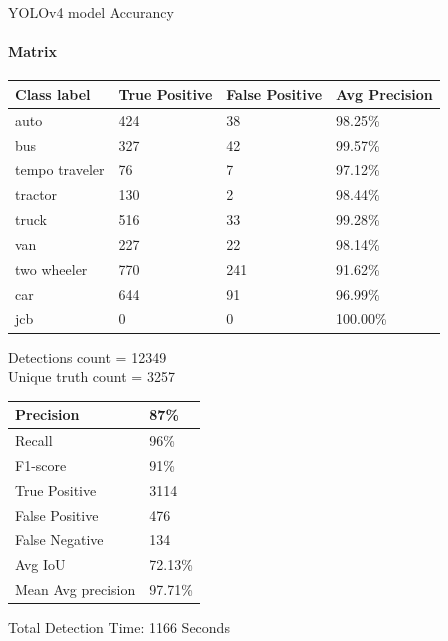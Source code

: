 \documentclass{beamer}
\begin{document}
	\begin{frame}[allowframebreaks]{YOLOv4 model Accurancy}
		\framesubtitle{Matrix}
		\begin{table}[]
			\begin{tabular}{|l|l|l|l|}
				\hline
				Class label    & True Positive & False Positive & Avg Precision \\ \hline
				auto           & 424           & 38             & 98.25\%       \\ \hline
				bus            & 327           & 42             & 99.57\%       \\ \hline
				tempo traveler & 76            & 7              & 97.12\%       \\ \hline
				tractor        & 130           & 2              & 98.44\%       \\ \hline
				truck          & 516           & 33             & 99.28\%       \\ \hline
				van            & 227           & 22             & 98.14\%       \\ \hline
				two wheeler    & 770           & 241            & 91.62\%       \\ \hline
				car            & 644           & 91             & 96.99\%       \\ \hline
				jcb            & 0             & 0              & 100.00\%      \\ \hline
			\end{tabular}
		\end{table}
		Detections count = 12349 \\
		Unique truth count = 3257
		\newpage
		
		\begin{table}[]
			\begin{tabular}{|l|l|}
				\hline
				Precision          & 87\%    \\ \hline
				Recall             & 96\%    \\ \hline
				F1-score           & 91\%    \\ \hline
				True Positive      & 3114    \\ \hline
				False Positive     & 476     \\ \hline
				False Negative     & 134     \\ \hline
				Avg IoU            & 72.13\% \\ \hline
				Mean Avg precision & 97.71\% \\ \hline
			\end{tabular}
		\end{table}
		Total Detection Time: 1166 Seconds
	\end{frame}
\end{document}

